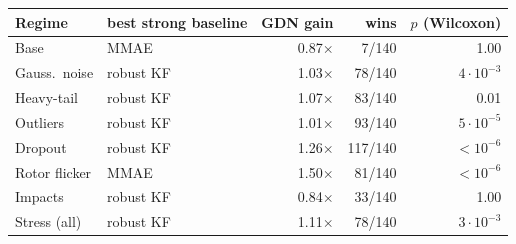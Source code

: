 \begin{tabular}{l l r r r}
\toprule
Regime & best strong baseline & GDN gain & wins & $p$ (Wilcoxon) \\
\midrule
Base & MMAE & 0.87$\times$ & 7/140 & 1.00 \\
Gauss.\ noise & robust KF & 1.03$\times$ & 78/140 & $4\!\cdot\!10^{-3}$ \\
Heavy-tail & robust KF & 1.07$\times$ & 83/140 & 0.01 \\
Outliers & robust KF & 1.01$\times$ & 93/140 & $5\!\cdot\!10^{-5}$ \\
Dropout & robust KF & 1.26$\times$ & 117/140 & $<\!10^{-6}$ \\
Rotor flicker & MMAE & 1.50$\times$ & 81/140 & $<\!10^{-6}$ \\
Impacts & robust KF & 0.84$\times$ & 33/140 & 1.00 \\
Stress (all) & robust KF & 1.11$\times$ & 78/140 & $3\!\cdot\!10^{-3}$ \\
\bottomrule
\end{tabular}
